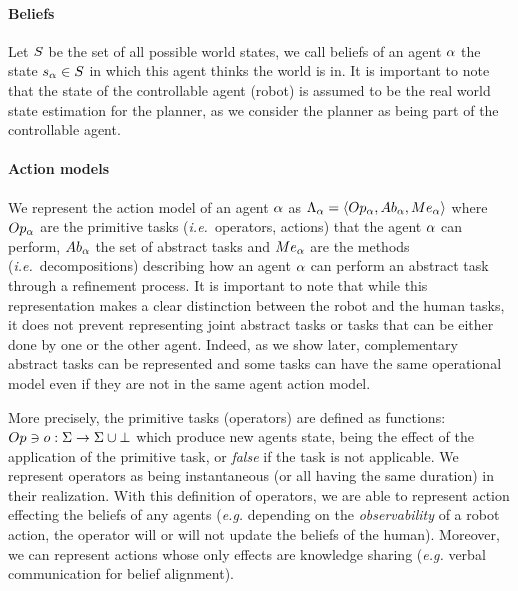 \paragraph{\bf Beliefs}
Let $S$ be the set of all possible world states, we call beliefs of an agent $\alpha$ the state $s_{\alpha} \in S$ in which this agent thinks the world is in. It is important to note that the state of the controllable agent (robot) is assumed to be the real world state estimation for the planner, as we consider the planner as being part of the controllable agent.

\paragraph{\bf Action models}
We represent the action model of an agent $\alpha$ as $\Lambda_{\alpha} = \langle Op_{\alpha}, Ab_{\alpha}, Me_{\alpha} \rangle$ where $Op_{\alpha}$ are the primitive tasks (\textit{i.e.}~operators, actions) that the agent $\alpha$ can perform, $Ab_{\alpha}$ the set of abstract tasks and $Me_{\alpha}$ are the methods (\textit{i.e.}~decompositions) describing how an agent $\alpha$ can perform an abstract task through a refinement process. It is important to note that while this representation makes a clear distinction between the robot and the human tasks, it does not prevent representing joint abstract tasks or tasks that can be either done by one or the other agent. Indeed, as we show later, complementary abstract tasks can be represented and some tasks can have the same operational model even if they are not in the same agent action model. 

More precisely, the primitive tasks (operators) are defined as functions: $Op \ni o: \Sigma \rightarrow \Sigma \cup \bot$ which produce new agents state, being the effect of the application of the primitive task, or \textit{false} if the task is not applicable. We represent operators as being instantaneous (or all having the same duration) in their realization. 
With this definition of operators, we are able to represent action effecting the beliefs of any agents (\textit{e.g.} depending on the \textit{observability} of a robot action, the operator will or will not update the beliefs of the human). Moreover, we can represent actions whose only effects are knowledge sharing (\textit{e.g.} verbal communication for belief alignment).

